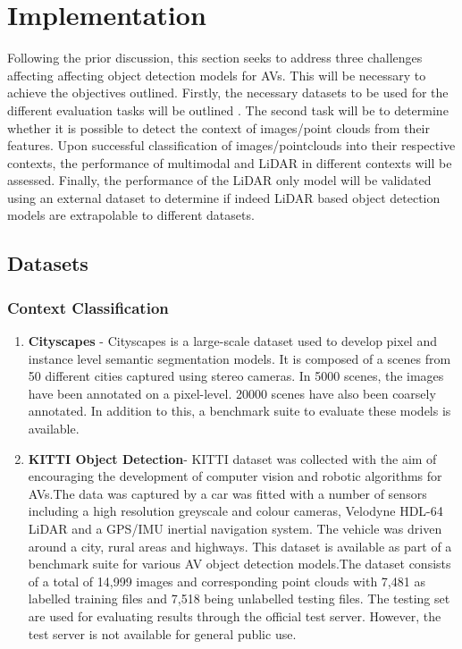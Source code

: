 \let\textcircled=\pgftextcircled


\chapter{Implementation}
\label{chap:implementation}

Following the prior discussion, this section seeks to address three challenges affecting affecting object detection models for AVs. This will be necessary to achieve the objectives outlined. Firstly, the necessary datasets to be used for the different evaluation tasks will be outlined . The second task will be to determine whether it is possible to detect the context of  images/point clouds from their features. Upon successful classification of images/pointclouds into their respective contexts, the performance of multimodal and LiDAR in different contexts will be assessed.  Finally, the performance of the LiDAR only model will be validated using an external dataset to determine if indeed LiDAR based object detection models are extrapolable to different datasets. 
\section{Datasets}
\subsection{Context Classification}
\begin{enumerate}
	\item \textbf{Cityscapes} - Cityscapes is a large-scale dataset used to develop pixel and instance level semantic segmentation models. It is composed of a scenes from 50 different cities captured using stereo cameras. In 5000 scenes, the images have been annotated on a pixel-level. 20000 scenes have also been coarsely annotated. In addition to this, a benchmark suite to evaluate these models is available.  
	
	\item \textbf{KITTI Object Detection}- KITTI dataset was collected with the aim of encouraging the development of computer vision and robotic algorithms for AVs.The data was captured by a car was fitted with a number of sensors including a high resolution greyscale and colour cameras, Velodyne HDL-64 LiDAR and a GPS/IMU inertial navigation system. The vehicle was driven around a city, rural areas and highways. This dataset is available as part of a benchmark suite for various AV object detection models.The dataset consists of  a total of 14,999 images and corresponding point clouds with  7,481 as labelled training files and 7,518 being unlabelled testing files. The testing set are used for evaluating results through the official test server. However, the test server is not available for general public use. 
\end{enumerate}

